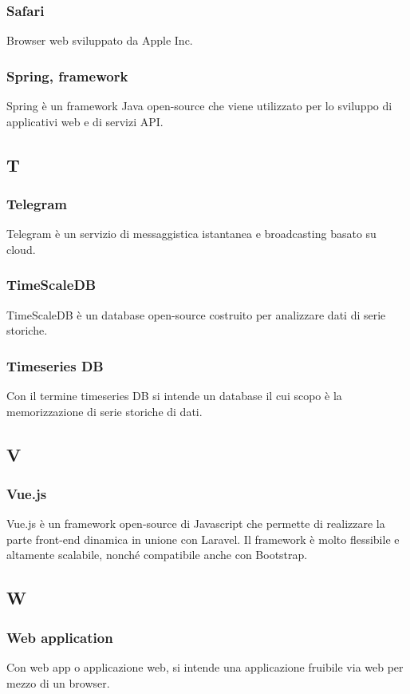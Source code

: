 \subsubsection*{Safari}
Browser web sviluppato da Apple Inc.
\subsubsection{Spring, framework}  Spring è un framework Java open-source che viene utilizzato per lo sviluppo di applicativi web e di servizi API.
\subsection{T}
\subsubsection{Telegram}  Telegram è un servizio di messaggistica istantanea e broadcasting basato su cloud.
\subsubsection{TimeScaleDB}  TimeScaleDB è un database open-source costruito per analizzare dati di serie storiche.
\subsubsection{Timeseries DB}  Con il termine timeseries DB si intende un database il cui scopo è la memorizzazione di serie storiche di dati.
\subsection{V}
\subsubsection{Vue.js}  Vue.js è un framework open-source di Javascript che permette di realizzare la parte front-end dinamica in unione con Laravel. Il framework è molto flessibile e altamente scalabile, nonché compatibile anche con Bootstrap.
\subsection{W}
\subsubsection*{Web application}
Con web app o applicazione web, si intende una applicazione fruibile via web per mezzo di un browser.